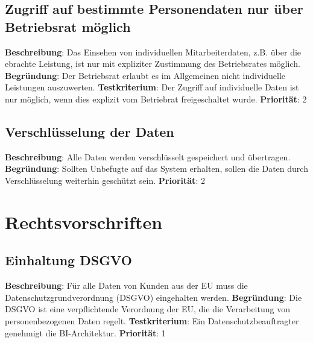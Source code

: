 \subsection{Zugriff auf bestimmte Personendaten nur über Betriebsrat möglich} \label{sec:anforderungsspezifikation:ZugriffMitBetriebsrat}
\textbf{Beschreibung}: Das Einsehen von individuellen Mitarbeiterdaten, z.B. über die ebrachte Leistung, ist nur mit expliziter Zustimmung des Betriebsrates möglich.
\newline \textbf{Begründung}: Der Betriebsrat erlaubt es im Allgemeinen nicht individuelle Leistungen auszuwerten.
\newline \textbf{Testkriterium}: Der Zugriff auf individuelle Daten ist nur möglich, wenn dies explizit vom Betriebrat freigeschaltet wurde. 
\newline \textbf{Priorität}: 2

\subsection{Verschlüsselung der Daten} \label{sec:anforderungsspezifikation:verschlüsselung}
\textbf{Beschreibung}: Alle Daten werden verschlüsselt gespeichert und übertragen.
\newline \textbf{Begründung}: Sollten Unbefugte auf das System erhalten, sollen die Daten durch Verschlüsselung weiterhin geschützt sein.
\newline \textbf{Priorität}: 2

\section{Rechtsvorschriften}

\subsection{Einhaltung DSGVO} \label{sec:anforderungsspezifikation:dsgvo}
\textbf{Beschreibung}: Für alle Daten von Kunden aus der EU muss die Datenschutzgrundverordnung (DSGVO) eingehalten werden.
\newline \textbf{Begründung}: Die DSGVO ist eine verpflichtende Verordnung der EU, die die Verarbeitung von personenbezogenen Daten regelt.
\newline \textbf{Testkriterium}: Ein Datenschutzbeauftragter genehmigt die BI-Architektur.
\newline \textbf{Priorität}: 1